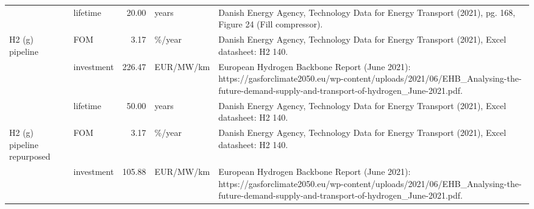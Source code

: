\begin{longtable}{p{5cm}p{3cm}rp{3cm}p{11cm}}
                      & lifetime &          20.00 &                             years &                                                                                                                                                                                                                             Danish Energy Agency, Technology Data for Energy Transport (2021), pg. 168, Figure 24 (Fill compressor). \\
H2 (g) pipeline & FOM &           3.17 &                            \%/year &                                                                                                                                                                                                                                          Danish Energy Agency, Technology Data for Energy Transport (2021), Excel datasheet: H2 140. \\
                      & investment &         226.47 &                         EUR/MW/km &                                                                                                                                               European Hydrogen Backbone Report (June 2021): https://gasforclimate2050.eu/wp-content/uploads/2021/06/EHB\_Analysing-the-future-demand-supply-and-transport-of-hydrogen\_June-2021.pdf. \\
                      & lifetime &          50.00 &                             years &                                                                                                                                                                                                                                          Danish Energy Agency, Technology Data for Energy Transport (2021), Excel datasheet: H2 140. \\
H2 (g) pipeline repurposed & FOM &           3.17 &                            \%/year &                                                                                                                                                                                                                                          Danish Energy Agency, Technology Data for Energy Transport (2021), Excel datasheet: H2 140. \\
                      & investment &         105.88 &                         EUR/MW/km &                                                                                                                                               European Hydrogen Backbone Report (June 2021): https://gasforclimate2050.eu/wp-content/uploads/2021/06/EHB\_Analysing-the-future-demand-supply-and-transport-of-hydrogen\_June-2021.pdf. \\

\end{longtable}
